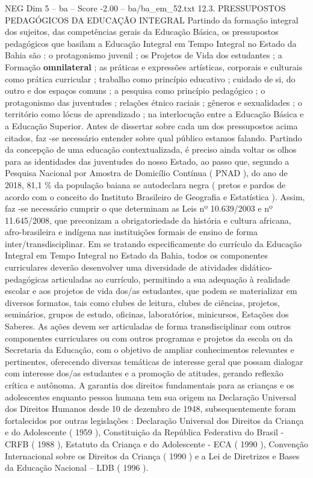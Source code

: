 \begin{textsample}{NEG Dim 5 – ba – Score -2.00 – ba/ba\_em\_52.txt}  \label{ex:f5_neg_013}
12.3.
PRESSUPOSTOS PEDAGÓGICOS DA EDUCAÇÃO INTEGRAL Partindo da formação integral dos sujeitos, das competências gerais da Educação Básica, os pressupostos pedagógicos que basilam a Educação Integral em Tempo Integral no Estado da Bahia são : o protagonismo juvenil ; os Projetos de Vida dos estudantes ; a Formação \textbf{omnilateral} ; as práticas e expressões artísticas, corporais e culturais como prática curricular ; trabalho como princípio educativo ; cuidado de si, do outro e dos espaços comuns ; a pesquisa como princípio pedagógico ; o protagonismo das juventudes ; relações étnico raciais ; gêneros e sexualidades ; o território como lócus de aprendizado ; na interlocução entre a Educação Básica e a Educação Superior.
Antes de dissertar sobre cada um dos pressupostos acima citados, faz -se necessário entender sobre qual público estamos falando.
Partindo da concepção de uma educação contextualizada, é preciso ainda voltar os olhos para as identidades das juventudes do nosso Estado, ao passo que, segundo a Pesquisa Nacional por Amostra de Domicílio Contínua ( PNAD ), do ano de 2018, 81,1 \% da população baiana se autodeclara negra ( pretos e pardos de acordo com o conceito do Instituto Brasileiro de Geografia e Estatística ).
Assim, faz -se necessário cumprir o que determinam as Leis nº 10.639/2003 e nº 11.645/2008, que preconizam a obrigatoriedade da história e cultura africana, afro-brasileira e indígena nas instituições formais de ensino de forma inter/transdisciplinar.
Em se tratando especificamente do currículo da Educação Integral em Tempo Integral no Estado da Bahia, todos os componentes curriculares deverão desenvolver uma diversidade de atividades didático-pedagógicas articuladas ao currículo, permitindo a sua adequação à realidade escolar e aos projetos de vida dos/as estudantes, que podem se materializar em diversos formatos, tais como clubes de leitura, clubes de ciências, projetos, seminários, grupos de estudo, oficinas, laboratórios, minicursos, Estações dos Saberes.
As ações devem ser articuladas de forma transdisciplinar com outros componentes curriculares ou com outros programas e projetos da escola ou da Secretaria da Educação, com o objetivo de ampliar conhecimentos relevantes e pertinentes, oferecendo diversas temáticas de interesse geral que possam dialogar com interesse dos/as estudantes e a promoção de atitudes, gerando reflexão crítica e autônoma.
A garantia dos direitos fundamentais para as crianças e os adolescentes enquanto pessoa humana tem sua origem na Declaração Universal dos Direitos Humanos desde 10 de dezembro de 1948, subsequentemente foram fortalecidos por outras legislações : Declaração Universal dos Direitos da Criança e do Adolescente ( 1959 ), Constituição da República Federativa do Brasil - CRFB ( 1988 ), Estatuto da Criança e do Adolescente - ECA ( 1990 ), Convenção Internacional sobre os Direitos da Criança ( 1990 ) e a Lei de Diretrizes e Bases da Educação Nacional – LDB ( 1996 ).

\end{textsample}
